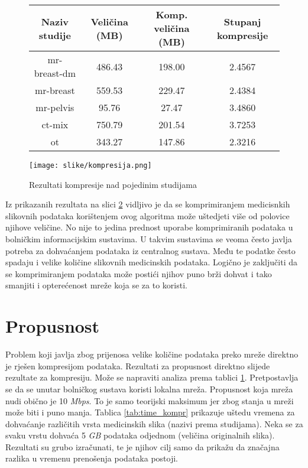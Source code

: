 \documentclass[times, utf8, zavrsni, numeric, sort]{fer}
\begin{document}
\begin{figure}
\begin{center}
 \label{tab:kompr}
\begin{tabular}{| c | c | c | c |}
\hline
Naziv studije & Veličina (MB) & Komp. veličina (MB) & Stupanj kompresije
\\
\hline
mr-breast-dm & 486.43 & 198.00  & 2.4567
\\
\hline
mr-breast & 559.53 & 229.47 & 2.4384
\\
\hline
mr-pelvis & 95.76 & 27.47  & 3.4860
\\
\hline
ct-mix & 750.79 & 201.54 & 3.7253
\\
\hline
ot & 343.27 & 147.86 & 2.3216
\\
\hline
\end{tabular}
\end{center}
\end{figure}

\begin{figure}[htb]
\centering
\texttt{[image: slike/kompresija.png]}
\caption{Rezultati kompresije nad pojedinim studijama}
\label{tab:kompresija}
\end{figure}



Iz prikazanih rezultata na slici \ref{tab:kompresija} vidljivo je da se komprimiranjem medicisnkih slikovnih podataka korištenjem ovog algoritma može uštedjeti više od polovice njihove veličine. No nije to jedina prednost uporabe komprimiranih podataka u bolničkim informacijskim sustavima. U takvim sustavima se veoma često javlja potreba za dohvaćanjem podataka iz centralnog sustava. Među te podatke često spadaju i velike količine slikovnih medicinskih podataka. Logično je zaključiti da se komprimiranjem podataka može postići njihov puno brži dohvat i tako smanjiti i opterećenost mreže koja se za to koristi.






\section{Propusnost}
Problem koji javlja zbog prijenosa velike količine podataka preko mreže direktno je rješen kompresijom podataka. Rezultati za propusnost direktno slijede rezultate za kompresiju. Može se napraviti analiza prema tablici \ref{tab:kompr}. Pretpostavlja se da se unutar bolničkog sustava koristi lokalna mreža. Propusnost koja mreža nudi obično je 10 \emph{Mbps}. To je samo teorijski maksimum jer zbog stanja u mreži može biti i puno manja. Tablica \ref{tab:time_kompr} prikazuje uštedu vremena za dohvaćanje različitih vrsta medicinskih slika (nazivi prema studijama). Neka se za svaku vrstu dohvaća 5 \emph{GB} podataka odjednom (veličina originalnih slika). Rezultati su grubo izračunati, te je njihov cilj samo da prikažu da značajna razlika u vremenu prenošenja podataka postoji.
\end{document}
